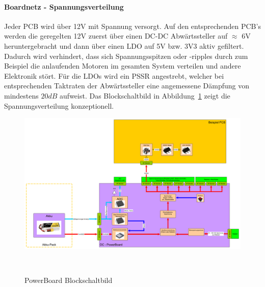 \documentclass[main.tex]{subfiles} %
\begin{document}
\paragraph{Boardnetz - Spannungsverteilung}
Jeder PCB wird über 12V mit Spannung versorgt. Auf den entsprechenden PCB's
werden die geregelten 12V zuerst über einen DC-DC Abwärtssteller auf $\approx$
6V heruntergebracht und dann über einen LDO auf 5V bzw. 3V3 aktiv gefiltert.
Dadurch wird verhindert, dass sich Spannungsspitzen oder -ripples durch zum
Beispiel die anlaufenden Motoren im gesamten System verteilen und andere
Elektronik stört. Für die LDOs wird ein PSSR angestrebt, welcher bei
entsprechenden Taktraten der Abwärtssteller eine angemessene Dämpfung von
mindestens $20dB$ aufweist. Das Blockschaltbild in
Abbildung~\ref{PowerBoard_Blockschaltbild} zeigt die Spannungsverteilung
konzeptionell.

\begin{figure}[H]
    \centering
    \includegraphics[width = 1\linewidth]{fig_Boardnetz/PowerBoard-Blockschaltbild.pdf}
    \caption{PowerBoard Blockschaltbild}~\label{PowerBoard_Blockschaltbild}
\end{figure}
\end{document}
